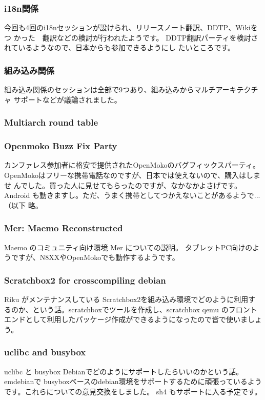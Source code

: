 \documentclass[mingoth,a4paper]{jsarticle}
\begin{document}
\subsubsection{i18n関係}
今回も4回のi18nセッションが設けられ、リリースノート翻訳、DDTP、Wikiをつ
かった　翻訳などの検討が行われたようです。
DDTP翻訳パーティを検討されているようなので、日本からも参加できるようにし
たいところです。

\subsubsection{組み込み関係}
組み込み関係のセッションは全部で9つあり、組み込みからマルチアーキテクチャ
サポートなどが議論されました。

\subsubsection{Multiarch round table}
\subsubsection{Openmoko Buzz Fix Party}
カンファレス参加者に格安で提供されたOpenMokoのバグフィックスパーティ。
OpenMokoはフリーな携帯電話なのですが、日本では使えないので、購入はしませ
んでした。買った人に見せてもらったのですが、なかなかよさげです。Android
も動きますし。ただ、うまく携帯としてつかえないことがあるようで...（以下
略。
\subsubsection{Mer: Maemo Reconstructed}
Maemo のコミュニティ向け環境 Mer についての説明。
タブレットPC向けのようですが、N8XXやOpenMokoでも動作するようです。

\subsubsection{Scratchbox2 for crosscompiling debian}
Riku がメンテナンスしている Scratchbox2を組み込み環境でどのように利用す
るのか、という話。scratchboxでツールを作成し、scratchbox qemu のフロント
エンドとして利用したパッケージ作成ができるようになったので皆で使いましょ
う。

\subsubsection{uclibc and busybox}
uclibc と busybox Debianでどのようにサポートしたらいいのかという話。
emdebianで busyboxベースのdebian環境をサポートするために頑張っているよう
です。これらについての意見交換をしました。
sh4 もサポートに入る予定です。
\end{document}
